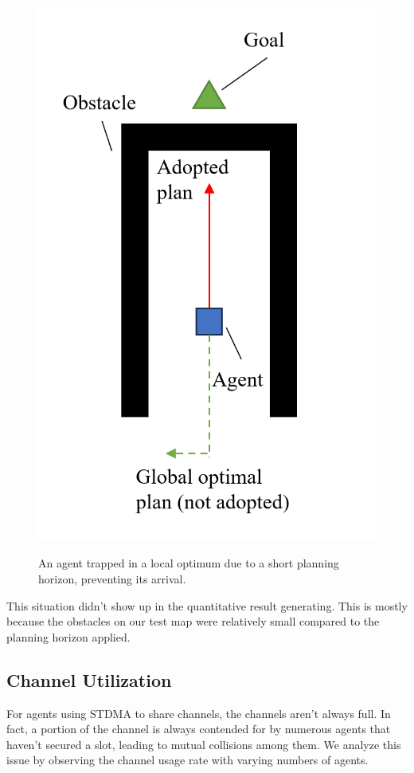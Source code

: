 \begin{figure}[htbp]
    \centering
    \includegraphics[width = 0.34\linewidth]{figures/Local Optimal Trap.png}
    \label{fig:LocalOptimalTrap}
    \caption{An agent trapped in a local optimum due to a short planning horizon, preventing its arrival.}%
\end{figure}
\FloatBarrier

This situation didn't show up in the quantitative result generating. This is mostly because the obstacles on our test map were relatively small compared to the planning horizon applied.

\subsection{Channel Utilization}

For agents using STDMA to share channels, the channels aren't always full. In fact, a portion of the channel is always contended for by numerous agents that haven't secured a slot, leading to mutual collisions among them.
We analyze this issue by observing the channel usage rate with varying numbers of agents.


